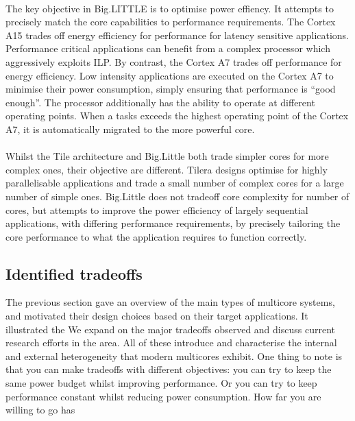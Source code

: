 \paragraph{} The key objective in Big.LITTLE is to optimise power effiency. It attempts to 
precisely match the core capabilities to performance requirements. The Cortex A15 trades off energy
efficiency for performance for latency sensitive applications. Performance critical applications
can benefit from a complex processor which aggressively exploits ILP. 
By contrast, the Cortex A7 trades off performance for energy efficiency. Low 
intensity applications are executed on the Cortex A7 to minimise their power 
consumption, simply ensuring that performance is ``good enough''.  The processor
additionally has the ability to operate at different operating points. When a tasks
exceeds the highest operating point of the Cortex A7, it is automatically migrated
to the more powerful core. 

\paragraph{} Whilst the Tile architecture and Big.Little both trade  simpler cores for 
more complex ones, their objective are different. Tilera designs optimise
for highly parallelisable applications and trade a small number of 
complex cores for a large number of simple ones. Big.Little does not
tradeoff core complexity for number of cores, but attempts to improve
the power efficiency of largely sequential applications, with differing
performance requirements,  by precisely tailoring the core performance to what
the application requires to function correctly. 

\subsection{Identified tradeoffs}

The previous section gave an overview of the main types of multicore systems, 
and motivated their design choices based on their target applications. 
It illustrated the 
We expand on the major tradeoffs observed and discuss current research efforts in the area. 
All of these introduce and characterise the internal and external heterogeneity that 
modern multicores exhibit. 
One thing to note is that you can make tradeoffs with different objectives:
you can try to keep the same power budget whilst improving performance. Or
you can try to keep performance constant whilst reducing power consumption. 
How far you are willing to go has

